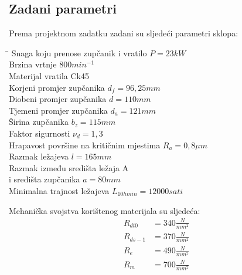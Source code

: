 \documentclass[11pt,a4paper]{article}
\begin{document}
\subsection{Zadani parametri}
Prema projektnom zadatku zadani su sljedeći parametri sklopa:\\
\begin{tabbing}
\hspace{260pt}\=\kill
 Snaga koju prenose zupčanik i vratilo \> $P=23 kW$ \\ 
 Brzina vrtnje \> $800 min^{-1}$ \\ 
 Materijal vratila \> Ck45 \\
 Korjeni promjer zupčanika \> $d_f=96,25mm$ \\ 
 Diobeni promjer zupčanika \> $d=110mm$ \\ 
 Tjemeni promjer zupčanika \> $d_a=121mm$ \\ 
 Širina zupčanika \> $b_z=115mm$ \\ 
 Faktor sigurnosti \> $\nu_d=1,3$ \\ 
 Hrapavost površine na kritičnim mjestima \> $R_a=0,8\mu m$ \\ 
 Razmak ležajeva \> $l=165mm$ \\ 
 Razmak između središta ležaja A\\ i središta zupčanika \> $a=80mm$ \\ 
 Minimalna trajnost ležajeva \> $L_{10h min}=12000 sati$
\end{tabbing}
Mehanička svojstva korištenog materijala su sljedeća:\\
\begin{align*}
R_{dt0}&=340 \textstyle\frac{N}{mm^2}\\
R_{ds-1}&=370 \textstyle\frac{N}{mm^2}\\
R_e&=490 \textstyle\frac{N}{mm^2}\\
R_m&=700 \textstyle\frac{N}{mm^2}
\end{align*}
 
\end{document}
